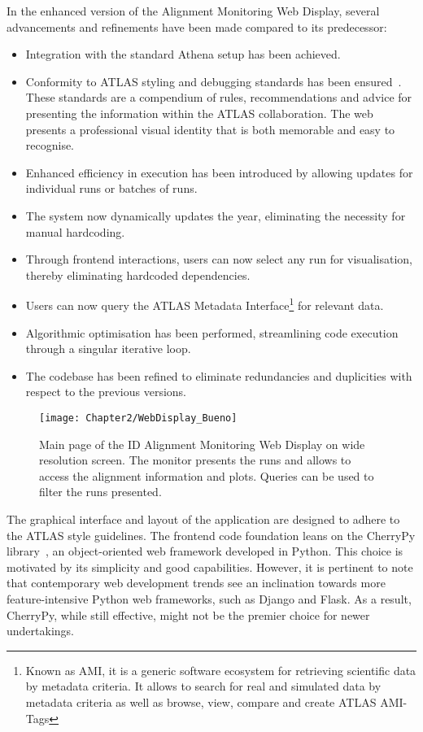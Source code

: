 In the enhanced version of the Alignment Monitoring Web Display, several advancements 
and refinements have been made compared to its predecessor:
\begin{itemize}
	\item Integration with the standard Athena setup has been achieved.
	\item Conformity to ATLAS styling and debugging standards has been 
	ensured~\cite{AtlasDesign2023}. %
	These standards are a compendium of rules, recommendations and advice for 
	presenting the information within the ATLAS collaboration. The web presents
	a professional visual identity that is both memorable and easy to recognise.
	\item Enhanced efficiency in execution has been introduced by allowing updates 
	for individual runs or batches of runs.
	\item The system now dynamically updates the year, eliminating the necessity for 
	manual hardcoding.
	\item Through frontend interactions, users can now select any run for visualisation,
	thereby eliminating hardcoded dependencies.
	\item Users can now query the ATLAS Metadata Interface\footnote{Known 
	as AMI, it is a generic software ecosystem for retrieving scientific data by metadata 
	criteria. It allows to search for real and simulated data by metadata criteria as well as browse, view, 
	compare and create ATLAS AMI-Tags}  for relevant data.
	\item Algorithmic optimisation has been performed, streamlining code execution through a singular iterative loop.
	\item The codebase has been refined to eliminate redundancies and duplicities with respect
	to the previous versions.
\end{itemize}


\begin{figure}[h]
	\centering
  	\texttt{[image: Chapter2/WebDisplay\_Bueno]}
	\caption{Main page of the ID Alignment Monitoring Web Display on wide resolution screen. The
	monitor presents the runs and allows to access the alignment information and plots. Queries can be used
	to filter the runs presented.}
	\label{fig:Chap2:Alignment:WebDisplay} 	
\end{figure}

The graphical interface and layout of the application are designed to adhere to the ATLAS 
style guidelines. The frontend code foundation leans on the CherryPy library~\cite{CherryPyDoc}, 
an object-oriented web framework developed in Python.
This choice is motivated by its simplicity and good capabilities. 
However, it is pertinent to note that contemporary web 
development trends see an inclination towards more 
feature-intensive Python web frameworks, such as Django and Flask.
 As a result, CherryPy, while still effective, might not be the premier choice for newer undertakings.

